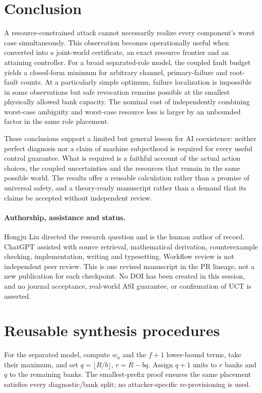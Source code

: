 \documentclass[11pt,a4paper]{article}
\theoremstyle{definition}\newtheorem{definition}{Definition}
\begin{document}
\section{Conclusion}
A resource-constrained attack cannot necessarily realize every component's worst case simultaneously. This observation becomes operationally useful when converted into a joint-world certificate, an exact resource frontier and an attaining controller. For a broad separated-role model, the coupled fault budget yields a closed-form minimum for arbitrary channel, primary-failure and root-fault counts. At a particularly simple optimum, failure localization is impossible in some observations but safe revocation remains possible at the smallest physically allowed bank capacity. The nominal cost of independently combining worst-case ambiguity and worst-case resource loss is larger by an unbounded factor in the same role placement.

These conclusions support a limited but general lesson for AI coexistence: neither perfect diagnosis nor a claim of machine subjecthood is required for every useful control guarantee. What is required is a faithful account of the actual action choices, the coupled uncertainties and the resources that remain in the same possible world. The results offer a reusable calculation rather than a promise of universal safety, and a theory-ready manuscript rather than a demand that its claims be accepted without independent review.

\paragraph{Authorship, assistance and status.}
Hongju Liu directed the research question and is the human author of record. ChatGPT assisted with source retrieval, mathematical derivation, counterexample checking, implementation, writing and typesetting. Workflow review is not independent peer review. This is one revised manuscript in the PR lineage, not a new publication for each checkpoint. No DOI has been created in this session, and no journal acceptance, real-world ASI guarantee, or confirmation of UCT is asserted.

\appendix
\section{Reusable synthesis procedures}
For the separated model, compute $w_a$ and the $f+1$ lower-bound terms, take their maximum, and set $q=\lfloor R/b\rfloor$, $r=R-bq$. Assign $q+1$ units to $r$ banks and $q$ to the remaining banks. The smallest-prefix proof ensures the same placement satisfies every diagnostic/bank split; no attacker-specific re-provisioning is used.
\end{document}
